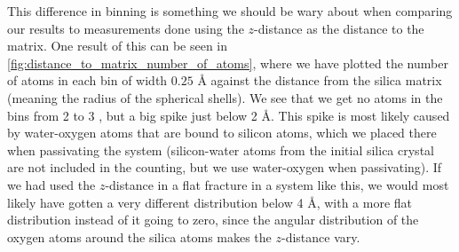 This difference in binning is something we should be wary about when comparing our results to measurements done using the $z$-distance as the distance to the matrix. One result of this can be seen in \cref{fig:distance_to_matrix_number_of_atoms}, where we have plotted the number of atoms in each bin of width $0.25\text{ \AA}$ against the distance from the silica matrix (meaning the radius of the spherical shells). We see that we get no atoms in the bins from 2 to 3 \Ang, but a big spike just below 2 \AA. This spike is most likely caused by water-oxygen atoms that are bound to silicon atoms, which we placed there when passivating the system (silicon-water atoms from the initial silica crystal are not included in the counting, but we use water-oxygen when passivating). If we had used the $z$-distance in a flat fracture in a system like this, we would most likely have gotten a very different distribution below 4 \AA, with a more flat distribution instead of it going to zero, since the angular distribution of the oxygen atoms around the silica atoms makes the $z$-distance vary.